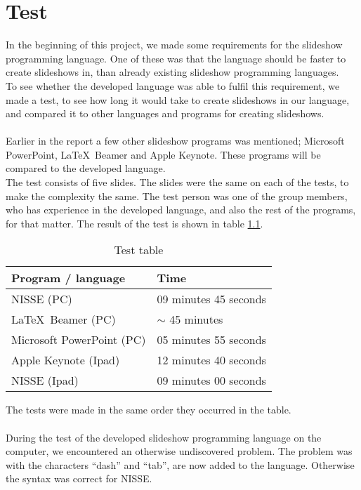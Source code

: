 \chapter{Test}
In the beginning of this project, we made some requirements for the slideshow programming language. One of these was that the language should be faster to create slideshows in, than already existing slideshow programming languages. \\
To see whether the developed language was able to fulfil this requirement, we made a test, to see how long it would take to create slideshows in our language, and compared it to other languages and programs for creating slideshows.
\\ \\
Earlier in the report a few other slideshow programs was mentioned; Microsoft PowerPoint, \LaTeX~Beamer and Apple Keynote. These programs will be compared to the developed language.\\
The test consists of five slides. The slides were the same on each of the tests, to make the complexity the same. The test person was one of the group members, who has experience in the developed language, and also the rest of the programs, for that matter.
The result of the test is shown in table \ref{tbl:TestTable}.
\begin{table}
\centering
   \begin{tabular}{ | l | l |}
    \hline
    Program / language & Time \\ \hline
    NISSE (PC) & 09 minutes 45 seconds \\ 
    \LaTeX~Beamer (PC) & $\sim$ 45 minutes \\
    Microsoft PowerPoint (PC) & 05 minutes 55 seconds \\ 
    Apple Keynote (Ipad) & 12 minutes 40 seconds \\ 
    NISSE (Ipad) & 09 minutes 00 seconds \\ \hline
    
    \end{tabular}
    \caption{Test table}
    \label{tbl:TestTable}
\end{table}
The tests were made in the same order they occurred in the table.
\\ \\
During the test of the developed slideshow programming language on the computer, we encountered an otherwise undiscovered problem. The problem was with the characters ``dash'' and ``tab'', are now added to the language. Otherwise the syntax was correct for NISSE. \\
